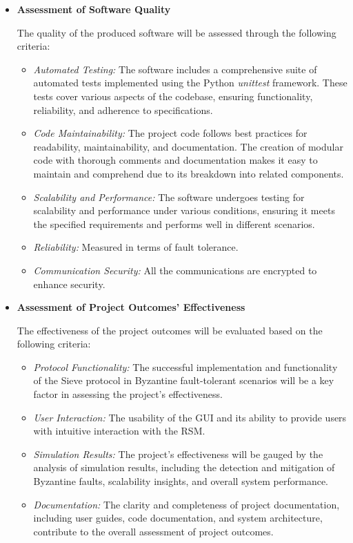 \documentclass{scrartcl}
\begin{document}
\begin{itemize}
    \item \textbf{Assessment of Software Quality}
    
    The quality of the produced software will be assessed through the following criteria:
    \begin{itemize}
        \item \textit{Automated Testing:} The software includes a comprehensive suite of automated tests implemented using the Python \textit{unittest} framework. These tests cover various aspects of the codebase, ensuring functionality, reliability, and adherence to specifications.
        
        \item \textit{Code Maintainability:} The project code follows best practices for readability, maintainability, and documentation. The creation of modular code with thorough comments and documentation makes it easy to maintain and comprehend due to its breakdown into related components.
    
        \item \textit{Scalability and Performance:} The software undergoes testing for scalability and performance under various conditions, ensuring it meets the specified requirements and performs well in different scenarios.

        \item \textit{Reliability:} Measured in terms of fault tolerance.

        \item \textit{Communication Security:} All the communications are encrypted to enhance security.
    \end{itemize}

    \item \textbf{Assessment of Project Outcomes' Effectiveness}
    
    The effectiveness of the project outcomes will be evaluated based on the following criteria:
    \begin{itemize}
        \item \textit{Protocol Functionality:} The successful implementation and functionality of the Sieve protocol in Byzantine fault-tolerant scenarios will be a key factor in assessing the project's effectiveness.
        
        \item \textit{User Interaction:} The usability of the GUI and its ability to provide users with intuitive interaction with the RSM.
        
        \item \textit{Simulation Results:} The project's effectiveness will be gauged by the analysis of simulation results, including the detection and mitigation of Byzantine faults, scalability insights, and overall system performance.
        
        \item \textit{Documentation:} The clarity and completeness of project documentation, including user guides, code documentation, and system architecture, contribute to the overall assessment of project outcomes.
    \end{itemize}
\end{itemize}
\end{document}
